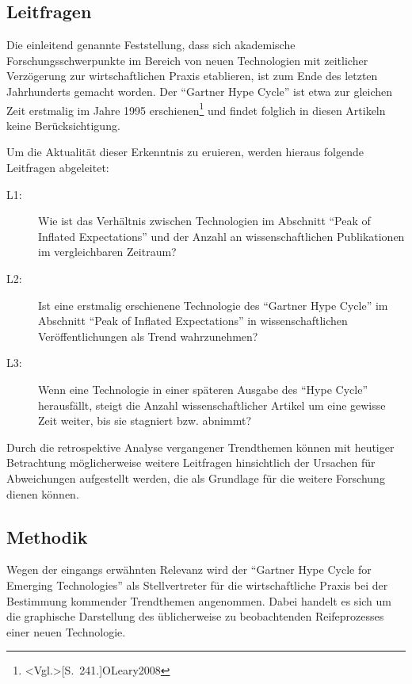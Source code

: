 \subsection{Leitfragen}
Die einleitend genannte Feststellung, dass sich akademische Forschungsschwerpunkte im Bereich von neuen Technologien mit zeitlicher Verzögerung zur wirtschaftlichen Praxis etablieren, ist zum Ende des letzten Jahrhunderts gemacht worden. Der "`Gartner Hype Cycle"' ist etwa zur gleichen Zeit erstmalig im Jahre 1995 erschienen\footnote{\citeNP<Vgl.>[S.~241.]{OLeary2008}} und findet folglich in diesen Artikeln keine Berücksichtigung.

Um die Aktualität dieser Erkenntnis zu eruieren, werden hieraus folgende Leitfragen abgeleitet:

\begin{description}
	\item[L1:] Wie ist das Verhältnis zwischen Technologien im Abschnitt "`Peak of Inflated Expectations"' und der Anzahl an wissenschaftlichen Publikationen im vergleichbaren Zeitraum?
\end{description}

\begin{description}
	\item[L2:] Ist eine erstmalig erschienene Technologie des "`Gartner Hype Cycle"' im Ab\-schnitt "`Peak of Inflated Expectations"' in wissen\-schaftlichen Ver\-öf\-fent\-lichungen als Trend wahrzunehmen?
\end{description}

\begin{description}
	\item[L3:] Wenn eine Technologie in einer späteren Ausgabe des "`Hype Cycle"' herausfällt, steigt die Anzahl wissenschaftlicher Artikel um eine gewisse Zeit weiter, bis sie stagniert bzw. abnimmt?
\end{description}

Durch die retrospektive Analyse vergangener Trendthemen können mit heutiger Betrachtung möglicherweise weitere Leitfragen hinsichtlich der Ursachen für Abweichungen aufgestellt werden, die als Grundlage für die weitere Forschung dienen können.

\subsection{Methodik}\label{sec:method}
Wegen der eingangs erwähnten Relevanz wird der "`Gartner Hype Cycle for Emerging Technologies"' als Stellvertreter für die wirtschaftliche Praxis bei der Bestimmung kommender Trendthemen angenommen. Dabei handelt es sich um die graphische Darstellung des üblicherweise zu beobachtenden Reifeprozesses einer neuen Technologie.

